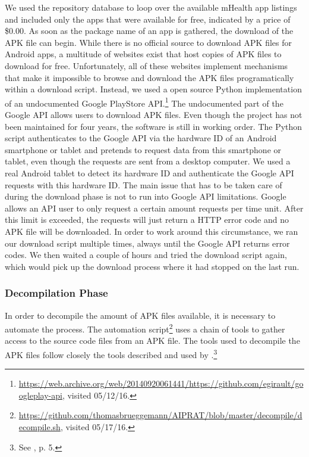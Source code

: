 We used the repository database to loop over the available mHealth app listings and included only the apps that were available for free, indicated by a price of \$0.00.
As soon as the package name of an app is gathered, the download of the \acs{APK} file can begin. 
While there is no official source to download \acs{APK} files for Android apps, a multitude of websites exist that host copies of \acs{APK} files to download for free.
Unfortunately, all of these websites implement mechanisms that make it impossible to browse and download the APK files programatically within a download script.
Instead, we used a open source Python implementation of an undocumented Google PlayStore \acs{API}.\footnote{\raggedright\url{https://web.archive.org/web/20140920061441/https://github.com/egirault/googleplay-api}, visited 05/12/16.} 
The undocumented part of the Google API allows users to download APK files.
Even though the project has not been maintained for four years, the software is still in working order.
The Python script authenticates to the Google API via the hardware ID of an Android smartphone or tablet and pretends to request data from this smartphone or tablet, even though the requests are sent from a desktop computer.
We used a real Android tablet to detect its hardware ID and authenticate the Google API requests with this hardware ID.
The main issue that has to be taken care of during the download phase is not to run into Google API limitations. 
Google allows an API user to only request a certain amount requests per time unit. 
After this limit is exceeded, the requests will just return a HTTP error code and no APK file will be downloaded.
In order to work around this circumstance, we ran our download script multiple times, always until the Google API returns error codes. 
We then waited a couple of hours and tried the download script again, which would pick up the download process where it had stopped on the last run.

\subsubsection{Decompilation Phase}

In order to decompile the amount of APK files available, it is necessary to automate the process. 
The automation script\footnote{\raggedright \url{https://github.com/thomasbrueggemann/AIPRAT/blob/master/decompile/decompile.sh}, visited 05/17/16.} uses a chain of tools to gather access to the source code files from an APK file.
The tools used to decompile the APK files follow closely the tools described and used by \cite{Enck2011}.\footnote{See \cite{Enck2011}, p. 5.}

